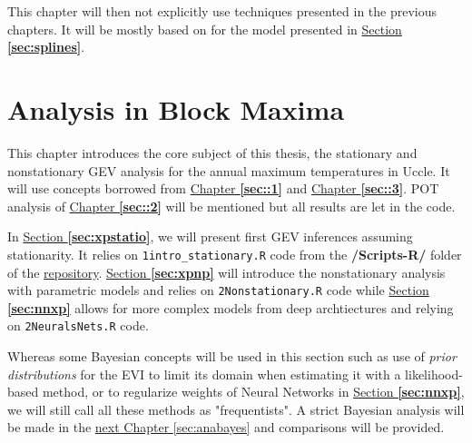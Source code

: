\documentclass[11pt,a4paper,openany, twosided]{book}
\begin{document}
This chapter will then not explicitly use techniques presented in the previous chapters. It will be mostly based on \citet{ruppert_semiparametric_2003} for the model presented in \hyperref[sec:splines]{Section \textbf{\ref{sec:splines}}}. 
  

\newpage




\chapter{Analysis in Block Maxima}\label{sec:anagev}
\minitoc \thispagestyle{empty}
 \vspace{1cm}
 
 This chapter introduces the core subject of this thesis, the stationary and nonstationary GEV analysis for the annual maximum temperatures in Uccle. It will use concepts borrowed from \hyperref[sec::1]{Chapter \textbf{\ref{sec::1}}} and \hyperref[sec::3]{Chapter \textbf{\ref{sec::3}}}. POT analysis of \hyperref[sec::2]{Chapter \textbf{\ref{sec::2}}} will be mentioned but all results are let in the code. 

In \hyperref[sec:xpstatio]{Section \textbf{\ref{sec:xpstatio}}}, we will present first GEV inferences assuming stationarity. It relies on \texttt{1intro\_stationary.R} code from the \textbf{/Scripts-R/} folder of the \href{https://github.com/proto4426/PissoortThesis/}{repository}.
\hyperref[sec:xpnp]{Section \textbf{\ref{sec:xpnp}}} will introduce the nonstationary analysis with parametric models and relies on \texttt{2Nonstationary.R} code while \hyperref[sec:nnxp]{Section \textbf{\ref{sec:nnxp}}} allows for more complex models from deep archtiectures and relying on \texttt{2NeuralsNets.R} code. 

Whereas some Bayesian concepts will be used in this section such as use of \emph{prior distributions} for the EVI to limit its domain when estimating it with a likelihood-based method, or to regularize weights of Neural Networks in \hyperref[sec:nnxp]{Section \textbf{\ref{sec:nnxp}}}, we will still call all these methods as "frequentists".
A strict Bayesian analysis will be made in the \hyperref[sec:anabayes]{next Chapter \ref{sec:anabayes}} and comparisons will be provided.

\newpage

\end{document}
